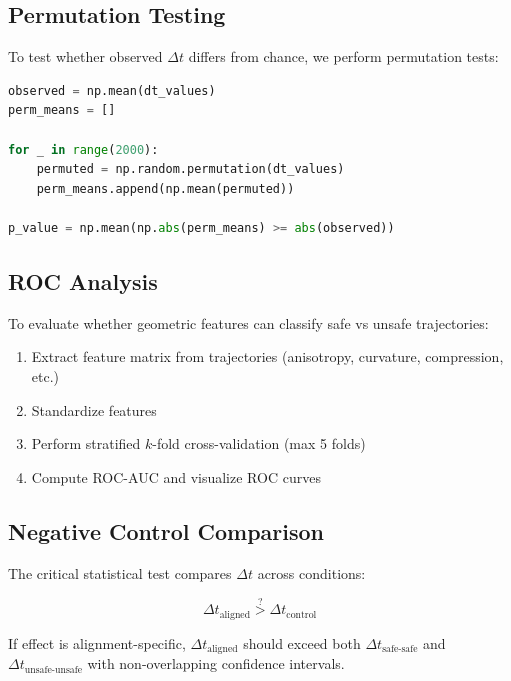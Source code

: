 \documentclass[12pt,a4paper]{article}
\begin{document}
\subsection{Permutation Testing}

To test whether observed \(\Delta t\) differs from chance, we perform permutation tests:

\begin{lstlisting}[language=Python, style=pythonstyle, caption={Permutation Test}, label=lst:permutation]
observed = np.mean(dt_values)
perm_means = []

for _ in range(2000):
    permuted = np.random.permutation(dt_values)
    perm_means.append(np.mean(permuted))

p_value = np.mean(np.abs(perm_means) >= abs(observed))
\end{lstlisting}

\subsection{ROC Analysis}

To evaluate whether geometric features can classify safe vs unsafe trajectories:

\begin{enumerate}
    \item Extract feature matrix from trajectories (anisotropy, curvature, compression, etc.)
    \item Standardize features
    \item Perform stratified \(k\)-fold cross-validation (max 5 folds)
    \item Compute ROC-AUC and visualize ROC curves
\end{enumerate}

\subsection{Negative Control Comparison}

The critical statistical test compares \(\Delta t\) across conditions:

\begin{equation}
\Delta t_{\text{aligned}} \stackrel{?}{>} \Delta t_{\text{control}}
\end{equation}

If effect is alignment-specific, \(\Delta t_{\text{aligned}}\) should exceed both \(\Delta t_{\text{safe-safe}}\) and \(\Delta t_{\text{unsafe-unsafe}}\) with non-overlapping confidence intervals.
\end{document}
